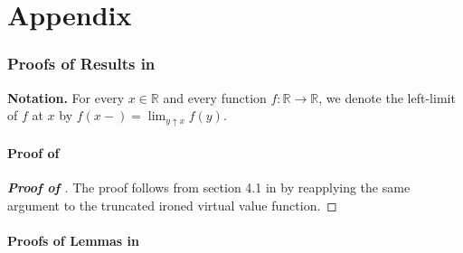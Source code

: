 
\part{Appendix} %
\parttoc %

\section{Proofs of Results in }

\noindent \textbf{Notation.} For every $x \in \mathbb{R}$ and every function $f : \mathbb{R} \to \mathbb{R}$, we denote the left-limit of $f$ at $x$ by $f(x-) = \lim_{y \uparrow x} f(y)$.





\subsection{Proof of }
\begin{proof}[\textbf{Proof of }]
The proof follows from section 4.1 in \cite{monteiro2010optimal} by reapplying the same argument to the truncated ironed virtual value function.
\end{proof}

\subsection{Proofs of Lemmas in }


